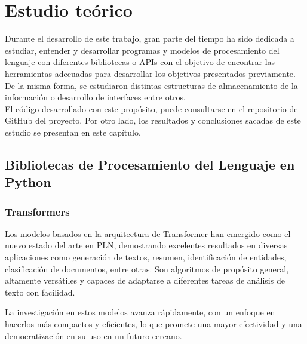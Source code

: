 \chapter{Estudio teórico}
\label{cap:Estudio teórico}
Durante el desarrollo de este trabajo, gran parte del tiempo ha sido dedicada a estudiar, entender y desarrollar programas y modelos de procesamiento del lenguaje con diferentes bibliotecas o APIs con el objetivo de encontrar las herramientas adecuadas para desarrollar los objetivos presentados previamente. De la misma forma, se estudiaron distintas estructuras de almacenamiento de la información o desarrollo de interfaces entre otros. \\

El código desarrollado con este propósito, puede consultarse en el repositorio de GitHub del proyecto. Por otro lado, los resultados y conclusiones sacadas de este estudio se presentan en este capítulo.  

\section{Bibliotecas de Procesamiento del Lenguaje en Python}

\subsection{Transformers}

Los modelos basados en la arquitectura de Transformer han emergido como el nuevo estado del arte en PLN, demostrando excelentes resultados en diversas aplicaciones como generación de textos, resumen, identificación de entidades, clasificación de documentos, entre otras. Son algoritmos de propósito general, altamente versátiles y capaces de adaptarse a diferentes tareas de análisis de texto con facilidad.

La investigación en estos modelos avanza rápidamente, con un enfoque en hacerlos más compactos y eficientes, lo que promete una mayor efectividad y una democratización en su uso en un futuro cercano.

